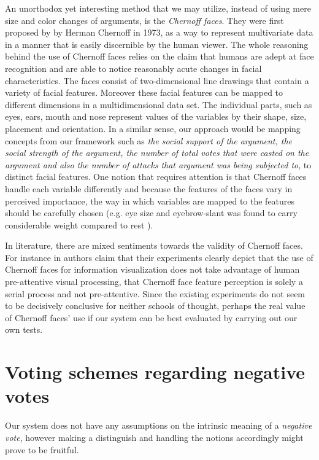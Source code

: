 \documentclass{article}
\begin{document}
An unorthodox yet interesting method that we may utilize, instead of using mere size and color changes of arguments, is the \textit{Chernoff faces}. They were first proposed by by Herman Chernoff \cite{Chernoff73} in 1973, as a way to represent multivariate data in a manner that is easily discernible by the human viewer.  The whole reasoning behind the use of Chernoff faces relies on the claim that humans are adept at face recognition and are able to notice reasonably acute changes in facial characteristics. The faces consist of two-dimensional line drawings that contain a variety of facial features. Moreover these facial features can be mapped to different dimensions in a multidimensional data set. The individual parts, such as eyes, ears, mouth and nose represent values of the variables by their shape, size, placement and orientation. In a similar sense, our approach would be mapping concepts from our framework such as  \textit{the social support of the argument, the social strength of the argument, the number of total votes that were casted on the argument and also the number of attacks that argument was being subjected to}, to distinct facial features. One notion that requires attention is that Chernoff faces handle each variable differently and because the features of the faces vary in perceived importance, the way in which variables are mapped to the features should be carefully chosen (e.g. eye size and eyebrow-slant was found to carry considerable weight compared to rest \cite{Morris00}).

In literature, there are mixed sentiments towards the validity of Chernoff faces. For instance in \cite{Morris00} authors claim that their experiments clearly depict that the use of Chernoff faces for information visualization does not take advantage of human pre-attentive visual processing, that Chernoff face feature perception is solely a serial process and not pre-attentive. Since the existing experiments do not seem to be decisively conclusive for neither schools of thought, perhaps the real value of Chernoff faces' use if our system can be best evaluated by carrying out our own tests.


\section{Voting schemes regarding negative votes}
Our system does not have any assumptions on the intrinsic meaning of a \textit{negative vote}, however making a distinguish and handling the notions accordingly might prove to be fruitful.
\end{document}
